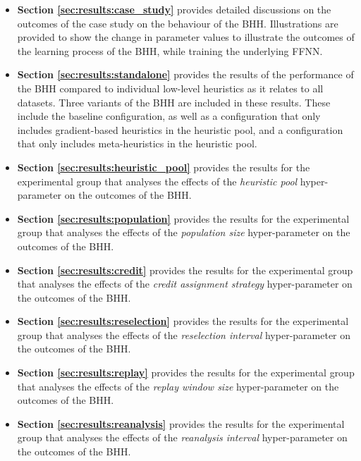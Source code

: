 \begin{itemize}
	\item \textbf{Section \ref{sec:results:case_study}} provides detailed discussions on the outcomes of the case study on the behaviour of the \acs{BHH}. Illustrations are provided to show the change in parameter values to illustrate the outcomes of the learning process of the \acs{BHH}, while training the underlying \acf{FFNN}.

	\item \textbf{Section \ref{sec:results:standalone}} provides the results of the performance of the \acs{BHH} compared to individual low-level heuristics as it relates to all datasets. Three variants of the \acs{BHH} are included in these results. These include the baseline configuration, as well as a configuration that only includes gradient-based heuristics in the heuristic pool, and a configuration that only includes meta-heuristics in the heuristic pool.

	\item \textbf{Section \ref{sec:results:heuristic_pool}} provides the results for the experimental group that analyses the effects of the \textit{heuristic pool} hyper-parameter on the outcomes of the \acs{BHH}.

	\item \textbf{Section \ref{sec:results:population}} provides the results for the experimental group that analyses the effects of the \textit{population size} hyper-parameter on the outcomes of the \acs{BHH}.

	\item \textbf{Section \ref{sec:results:credit}} provides the results for the experimental group that analyses the effects of the \textit{credit assignment strategy} hyper-parameter on the outcomes of the \acs{BHH}.

	\item \textbf{Section \ref{sec:results:reselection}} provides the results for the experimental group that analyses the effects of the \textit{reselection interval} hyper-parameter on the outcomes of the \acs{BHH}.

	\item \textbf{Section \ref{sec:results:replay}} provides the results for the experimental group that analyses the effects of the \textit{replay window size} hyper-parameter on the outcomes of the \acs{BHH}.

	\item \textbf{Section \ref{sec:results:reanalysis}} provides the results for the experimental group that analyses the effects of the \textit{reanalysis interval} hyper-parameter on the outcomes of the \acs{BHH}.


\end{itemize}
